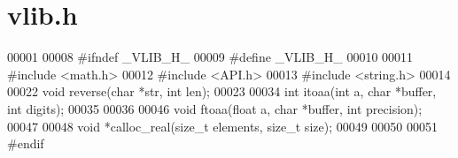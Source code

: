 \section{vlib.\+h}
\label{vlib_8h_source}

\begin{DoxyCode}
00001 
00008 \textcolor{preprocessor}{#ifndef \_VLIB\_H\_}
00009 \textcolor{preprocessor}{#define \_VLIB\_H\_}
00010 
00011 \textcolor{preprocessor}{#include <math.h>}
00012 \textcolor{preprocessor}{#include <API.h>}
00013 \textcolor{preprocessor}{#include <string.h>}
00014 
00022 \textcolor{keywordtype}{void} reverse(\textcolor{keywordtype}{char} *str, \textcolor{keywordtype}{int} len);
00023 
00034 \textcolor{keywordtype}{int} itoaa(\textcolor{keywordtype}{int} a, \textcolor{keywordtype}{char} *buffer, \textcolor{keywordtype}{int} digits);
00035 
00036 
00046 \textcolor{keywordtype}{void} ftoaa(\textcolor{keywordtype}{float} a, \textcolor{keywordtype}{char} *buffer, \textcolor{keywordtype}{int} precision);
00047 
00048 \textcolor{keywordtype}{void} *calloc_real(\textcolor{keywordtype}{size\_t} elements, \textcolor{keywordtype}{size\_t} size);
00049 
00050 
00051 \textcolor{preprocessor}{#endif}
\end{DoxyCode}
